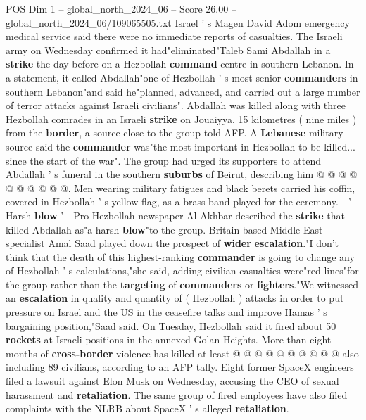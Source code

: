 \begin{textsample}{POS Dim 1 – global\_north\_2024\_06 – Score 26.00 – global\_north\_2024\_06/109065505.txt}
Israel ' s Magen David Adom emergency medical service said there were no immediate reports of casualties.
The Israeli army on Wednesday confirmed it had"eliminated"Taleb Sami Abdallah in a \textbf{strike} the day before on a Hezbollah \textbf{command} centre in southern Lebanon.
In a statement, it called Abdallah"one of Hezbollah ' s most senior \textbf{commanders} in southern Lebanon"and said he"planned, advanced, and carried out a large number of terror attacks against Israeli civilians".
Abdallah was killed along with three Hezbollah comrades in an Israeli \textbf{strike} on Jouaiyya, 15 kilometres ( nine miles ) from the \textbf{border}, a source close to the group told AFP.
A \textbf{Lebanese} military source said the \textbf{commander} was"the most important in Hezbollah to be killed... since the start of the war".
The group had urged its supporters to attend Abdallah ' s funeral in the southern \textbf{suburbs} of Beirut, describing him @ @ @ @ @ @ @ @ @ @.
Men wearing military fatigues and black berets carried his coffin, covered in Hezbollah ' s yellow flag, as a brass band played for the ceremony. - ' Harsh \textbf{blow} ' - Pro-Hezbollah newspaper Al-Akhbar described the \textbf{strike} that killed Abdallah as"a harsh \textbf{blow}"to the group.
Britain-based Middle East specialist Amal Saad played down the prospect of \textbf{wider} \textbf{escalation}."I don't think that the death of this highest-ranking \textbf{commander} is going to change any of Hezbollah ' s calculations,"she said, adding civilian casualties were"red lines"for the group rather than the \textbf{targeting} of \textbf{commanders} or \textbf{fighters}."We witnessed an \textbf{escalation} in quality and quantity of ( Hezbollah ) attacks in order to put pressure on Israel and the US in the ceasefire talks and improve Hamas ' s bargaining position,"Saad said.
On Tuesday, Hezbollah said it fired about 50 \textbf{rockets} at Israeli positions in the annexed Golan Heights.
More than eight months of \textbf{cross-border} violence has killed at least @ @ @ @ @ @ @ @ @ @ also including 89 civilians, according to an AFP tally.
Eight former SpaceX engineers filed a lawsuit against Elon Musk on Wednesday, accusing the CEO of sexual harassment and \textbf{retaliation}.
The same group of fired employees have also filed complaints with the NLRB about SpaceX ' s alleged \textbf{retaliation}.

\end{textsample}

